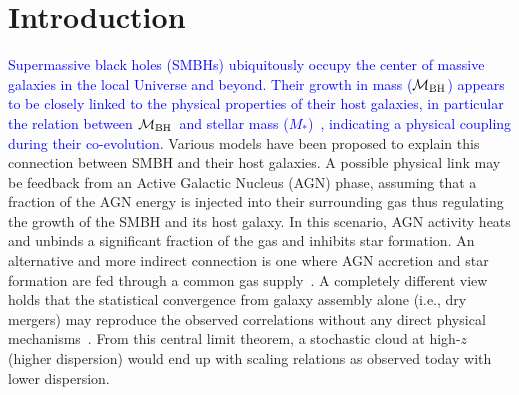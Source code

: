 \documentclass[twocolumn,trackchanges]{aastex63}
\newcommand{\mbh}{$\mathcal M_{\rm BH}$}
\newcommand{\mstar}{{$M_*$}}
\newcommand{\blue}[1]{{ \textcolor{blue}{#1}}}
\begin{document}

\section{Introduction} \label{sec:intro}
\blue{Supermassive black holes (SMBHs) ubiquitously occupy the center of massive galaxies in the local Universe and beyond. Their growth in mass (\mbh) appears to be closely linked to the physical properties of their host galaxies, in particular the relation between \mbh ~and stellar mass (\mstar)~\citep{Mag++98, F+M00, M+H03, H+R04, Gul++09}, indicating a physical coupling during their co-evolution.}
Various models have been proposed to explain this connection between SMBH and their host galaxies. A possible physical link may be feedback from an Active Galactic Nucleus (AGN) phase, assuming that a fraction of the AGN energy is injected into their surrounding gas thus regulating the growth of the SMBH and its host galaxy. In this scenario, AGN activity heats and unbinds a significant fraction of the gas and inhibits star formation. An alternative and more indirect connection is one where AGN accretion and star formation are fed through a common gas supply~\citep{Cen2015, Menci2016}. A completely different view holds that the statistical convergence from galaxy assembly alone (i.e., dry mergers) may reproduce the observed correlations without any direct physical mechanisms~\citep{Peng2007, Jahnke2011, Hirschmann2010}. From this central limit theorem, a stochastic cloud at high-$z$ (higher dispersion) would end up with scaling relations as observed today with lower dispersion.
\end{document}
